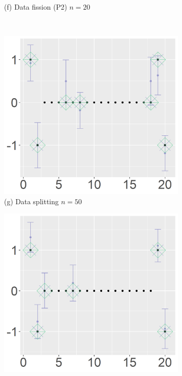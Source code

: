 \begin{figure}[ht!]
\begin{subfigure}[b]{.32\columnwidth}
    \caption{(f) Data fission (P2) $n=20$}
\end{subfigure}
\\
\centering
\begin{subfigure}[b]{.32\columnwidth} 
    \includegraphics[width=\columnwidth]{../../plot/split_50_1_1.png}
    \caption{(g) Data splitting $n=50$}
\end{subfigure}
\hfill
\centering
\begin{subfigure}[b]{.32\columnwidth} 
    \includegraphics[width=\columnwidth]{../../plot/p1_50_1_1.png}

\end{subfigure}
\end{figure}
